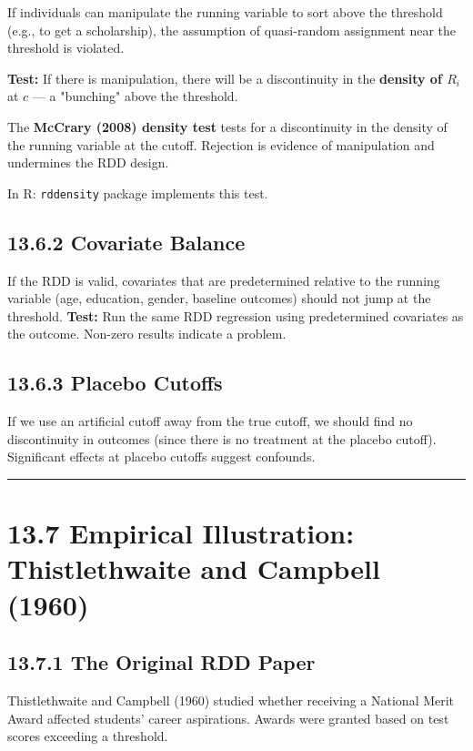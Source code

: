 If individuals can manipulate the running variable to sort above the threshold (e.g., to get a scholarship), the assumption of quasi-random assignment near the threshold is violated.

\textbf{Test:} If there is manipulation, there will be a discontinuity in the \textbf{density of $R_i$} at $c$ --- a "bunching" above the threshold.

The \textbf{McCrary (2008) density test} tests for a discontinuity in the density of the running variable at the cutoff. Rejection is evidence of manipulation and undermines the RDD design.

In R: \texttt{rddensity} package implements this test.

\subsection{13.6.2 Covariate Balance}

If the RDD is valid, covariates that are predetermined relative to the running variable (age, education, gender, baseline outcomes) should not jump at the threshold. \textbf{Test:} Run the same RDD regression using predetermined covariates as the outcome. Non-zero results indicate a problem.

\subsection{13.6.3 Placebo Cutoffs}

If we use an artificial cutoff away from the true cutoff, we should find no discontinuity in outcomes (since there is no treatment at the placebo cutoff). Significant effects at placebo cutoffs suggest confounds.

\medskip\hrule\medskip

\section{13.7 Empirical Illustration: Thistlethwaite and Campbell (1960)}

\subsection{13.7.1 The Original RDD Paper}

Thistlethwaite and Campbell (1960) studied whether receiving a National Merit Award affected students' career aspirations. Awards were granted based on test scores exceeding a threshold.

